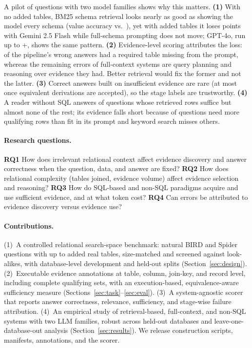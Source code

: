 \documentclass[11pt]{article}
\begin{document}
A pilot of \nQuestions{} questions with two model families shows why this matters. \textbf{(1)} With no added tables, BM25 schema retrieval looks nearly as good as showing the model every schema (value accuracy \bmValueAtZero{} vs.\ \gmFsZeroCommon{}), yet with \topLevel{} added tables it loses \bmDeltaAbsTop{} points with Gemini 2.5 Flash while full-schema prompting does not move; GPT-4o, run up to +\gpCommonTop{}, shows the same pattern. \textbf{(2)} Evidence-level scoring attributes the loss: \bmMissedOfWrongP{} of the pipeline's wrong answers had a required table missing from the prompt, whereas the remaining errors of full-context systems are query planning and reasoning over evidence they had. Better retrieval would fix the former and not the latter. \textbf{(3)} Correct answers built on insufficient evidence are rare (at most \bmCorrectInsuffEq{} once equivalent derivations are accepted), so the stage labels are trustworthy. \textbf{(4)} A reader without SQL answers \rrSuffAccPct{} of questions whose retrieved rows suffice but almost none of the rest; its evidence falls short because \nOverNinety{} of \nQuestions{} questions need more qualifying rows than fit in its prompt and keyword search misses others.

\paragraph{Research questions.}
\textbf{RQ1} How does irrelevant relational context affect evidence discovery and answer correctness when the question, data, and answer are fixed?
\textbf{RQ2} How does relational complexity (tables joined, evidence volume) affect evidence selection and reasoning?
\textbf{RQ3} How do SQL-based and non-SQL paradigms acquire and use sufficient evidence, and at what token cost?
\textbf{RQ4} Can errors be attributed to evidence discovery versus evidence use?

\paragraph{Contributions.}
(1)~A controlled relational search-space benchmark: natural BIRD and Spider questions with up to \topLevel{} added real tables, size-matched and screened against look-alikes, with database-level development and held-out splits (Section~\ref{sec:design}).
(2)~Executable evidence annotations at table, column, join-key, and record level, including complete qualifying sets, with an execution-based, equivalence-aware sufficiency measure (Sections~\ref{sec:task}--\ref{sec:eval}).
(3)~A system-agnostic scorer that reports answer correctness, relevance, sufficiency, and stage-wise failure attribution.
(4)~An empirical study of retrieval-based, full-context, and non-SQL systems with two LLM families, robust across held-out databases and leave-one-database-out analysis (Section~\ref{sec:results}).
We release construction scripts, manifests, annotations, and the scorer.
\end{document}
